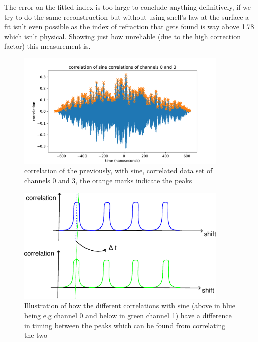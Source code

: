 The error on the fitted index is too large to conclude anything definitively, if we try to do 
the same reconstruction but without using snell's law at the surface a fit isn't even possible
as the index of refraction that gets found is way above 1.78 which isn't physical.
Showing just how unreliable (due to the high correction factor) this measurement is.
\begin{figure}
	\centering
	\includegraphics[width=0.9\textwidth]{figures/crosscorrelation.pdf}
	\caption{correlation of the previously, with sine, correlated data set
	of channels 0 and 3, the orange marks indicate the peaks}
	\label{fig:CrossCorr}
\end{figure}
\begin{figure}
	\centering
	\includegraphics[width=0.9\textwidth]{figures/IlluCorr.pdf}
	\caption{Illustration of how the different correlations with sine (above
	in blue being e.g channel 0 and below in green channel 1) have a difference
in timing between the peaks which can be found from correlating the two}
	\label{fig:CorrIllu}
\end{figure}

